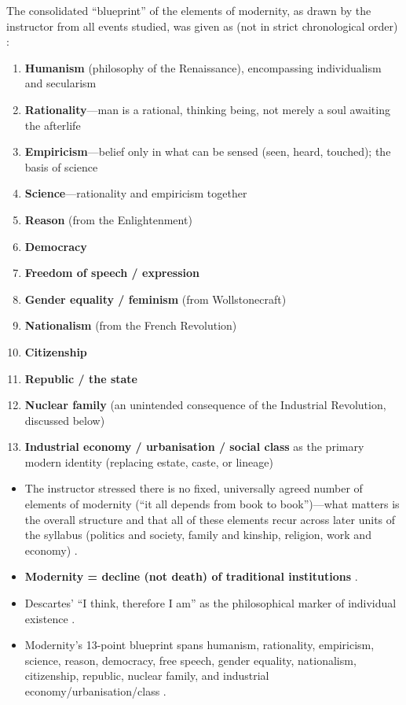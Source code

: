 \begin{KeyConcept}
The consolidated ``blueprint'' of the elements of modernity, as drawn by the instructor from all events studied, was given as (not in strict chronological order) :
\begin{enumerate}
    \item \textbf{Humanism} (philosophy of the Renaissance), encompassing individualism and secularism 
    \item \textbf{Rationality}---man is a rational, thinking being, not merely a soul awaiting the afterlife 
    \item \textbf{Empiricism}---belief only in what can be sensed (seen, heard, touched); the basis of science 
    \item \textbf{Science}---rationality and empiricism together 
    \item \textbf{Reason} (from the Enlightenment) 
    \item \textbf{Democracy} 
    \item \textbf{Freedom of speech / expression} 
    \item \textbf{Gender equality / feminism} (from Wollstonecraft) 
    \item \textbf{Nationalism} (from the French Revolution) 
    \item \textbf{Citizenship} 
    \item \textbf{Republic / the state} 
    \item \textbf{Nuclear family} (an unintended consequence of the Industrial Revolution, discussed below) 
    \item \textbf{Industrial economy / urbanisation / social class} as the primary modern identity (replacing estate, caste, or lineage) 
\end{enumerate}
\end{KeyConcept}

\begin{CriticalPoint}
\begin{itemize}
    \item The instructor stressed there is no fixed, universally agreed number of elements of modernity (``it all depends from book to book'')---what matters is the overall structure and that all of these elements recur across later units of the syllabus (politics and society, family and kinship, religion, work and economy) .
\end{itemize}
\end{CriticalPoint}

\begin{QuickRevision}
\begin{itemize}
    \item \textbf{Modernity = decline (not death) of traditional institutions} .
    \item Descartes' ``I think, therefore I am'' as the philosophical marker of individual existence .
    \item Modernity's 13-point blueprint spans humanism, rationality, empiricism, science, reason, democracy, free speech, gender equality, nationalism, citizenship, republic, nuclear family, and industrial economy/urbanisation/class .
\end{itemize}
\end{QuickRevision}

